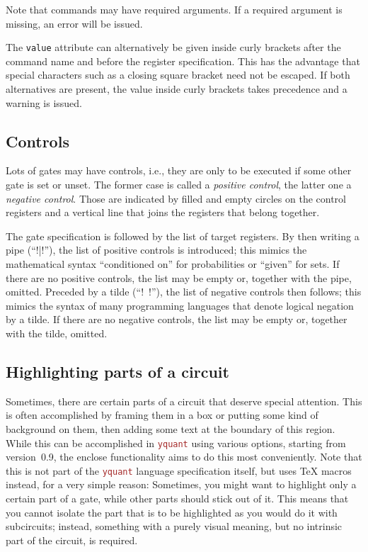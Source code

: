 \documentclass{scrartcl}
\def\pkg#1{\textcolor{brown}{\texttt{#1}}}
\def\Yquant{\pkg{yquant}}
\begin{document}
         Note that commands may have required arguments.
         If a required argument is missing, an error will be issued.

         The \texttt{value} attribute can alternatively be given inside curly brackets after the command name and before the register specification.
         This has the advantage that special characters such as a closing square bracket need not be escaped.
         If both alternatives are present, the value inside curly brackets takes precedence and a warning is issued.

      \subsection{Controls}
         Lots of gates may have controls, i.e., they are only to be executed if some other gate is set or unset.
         The former case is called a \emph{positive control}, the latter one a \emph{negative control}.
         Those are indicated by filled and empty circles on the control registers and a vertical line that joins the registers that belong together.

         The gate specification is followed by the list of target registers.
         By then writing a pipe (``\yquant!|!''), the list of positive controls is introduced; this mimics the mathematical syntax ``conditioned on'' for probabilities or ``given'' for sets.
         If there are no positive controls, the list may be empty or, together with the pipe, omitted.
         Preceded by a tilde (``\yquant!~!''), the list of negative controls then follows; this mimics the syntax of many programming languages that denote logical negation by a tilde.
         If there are no negative controls, the list may be empty or, together with the tilde, omitted.

      \subsection[Highlighting parts of a circuit]{Highlighting parts of a circuit}\label{sec:enclose}
         Sometimes, there are certain parts of a circuit that deserve special attention.
         This is often accomplished by framing them in a box or putting some kind of background on them, then adding some text at the boundary of this region.
         While this can be accomplished in \Yquant{} using various options, starting from version~0.9, the enclose functionality aims to do this most conveniently.
         Note that this is not part of the \Yquant{} language specification itself, but uses \TeX{} macros instead, for a very simple reason: Sometimes, you might want to highlight only a certain part of a gate, while other parts should stick out of it.
         This means that you cannot isolate the part that is to be highlighted as you would do it with subcircuits; instead, something with a purely visual meaning, but no intrinsic part of the circuit, is required.
\end{document}
